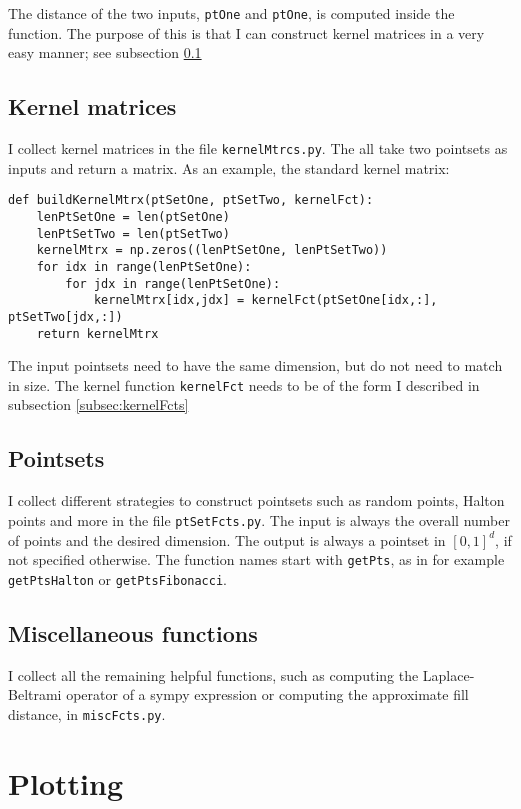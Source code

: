 \documentclass[12pt]{article}
\begin{document}
The distance of the two inputs, \texttt{ptOne} and \texttt{ptOne}, is computed inside the function. The purpose of this is that I can construct kernel matrices in a very easy manner; see subsection \ref{subsec:kernelMtrcs}

\subsection{Kernel matrices}
\label{subsec:kernelMtrcs}
I collect kernel matrices in the file \texttt{kernelMtrcs.py}. The all take two pointsets as inputs and return a matrix. As an example, the standard kernel matrix: 
\begin{Verbatim}[formatcom=\color{blue!50!black}]
def buildKernelMtrx(ptSetOne, ptSetTwo, kernelFct):
    lenPtSetOne = len(ptSetOne)
    lenPtSetTwo = len(ptSetTwo)
    kernelMtrx = np.zeros((lenPtSetOne, lenPtSetTwo))
    for idx in range(lenPtSetOne):
        for jdx in range(lenPtSetOne):
            kernelMtrx[idx,jdx] = kernelFct(ptSetOne[idx,:], ptSetTwo[jdx,:])
    return kernelMtrx
\end{Verbatim}

The input pointsets need to have the same dimension, but do not need to match in size. The kernel function \texttt{kernelFct} needs to be of the form I described in subsection \ref{subsec:kernelFcts}


\subsection{Pointsets}
I collect different strategies to construct pointsets such as random points, Halton points and more in the file \texttt{ptSetFcts.py}. The input is always the overall number of points and the desired dimension. The output is always a pointset in $[0,1]^d$, if not specified otherwise. The function names start with \texttt{getPts}, as in for example \texttt{getPtsHalton} or \texttt{getPtsFibonacci}.

\subsection{Miscellaneous functions}

I collect all the remaining helpful functions, such as computing the Laplace-Beltrami operator of a sympy expression or computing the approximate fill distance, in \texttt{miscFcts.py}. 

\section{Plotting}
\end{document}
